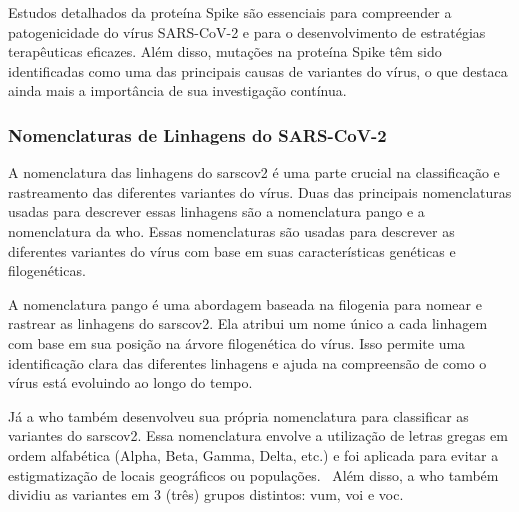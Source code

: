 Estudos detalhados da proteína Spike são essenciais para compreender a patogenicidade do vírus SARS-CoV-2 e para o desenvolvimento de estratégias terapêuticas eficazes. Além disso, mutações na proteína Spike têm sido identificadas como uma das principais causas de variantes do vírus, o que destaca ainda mais a importância de sua investigação contínua.

\subsubsection{Nomenclaturas de Linhagens do SARS-CoV-2}
A nomenclatura das linhagens do \gls{sarscov2} é uma parte crucial na classificação e rastreamento das diferentes variantes do vírus. Duas das principais nomenclaturas usadas para descrever essas linhagens são a nomenclatura \gls{pango} e a nomenclatura da \gls{who}. Essas nomenclaturas são usadas para descrever as diferentes variantes do vírus com base em suas características genéticas e filogenéticas.

A nomenclatura \gls{pango} é uma abordagem baseada na filogenia para nomear e rastrear as linhagens do \gls{sarscov2}. Ela atribui um nome único a cada linhagem com base em sua posição na árvore filogenética do vírus. Isso permite uma identificação clara das diferentes linhagens e ajuda na compreensão de como o vírus está evoluindo ao longo do tempo.~\cite{pango_rambaut_2020}

Já a \gls{who} também desenvolveu sua própria nomenclatura para classificar as variantes do \gls{sarscov2}. Essa nomenclatura envolve a utilização de letras gregas em ordem alfabética (Alpha, Beta, Gamma, Delta, etc.) e foi aplicada para evitar a estigmatização de locais geográficos ou populações.~\cite{who_variants} Além disso, a \gls{who} também dividiu as variantes em 3 (três) grupos distintos: \gls{vum}, \gls{voi} e \gls{voc}.

